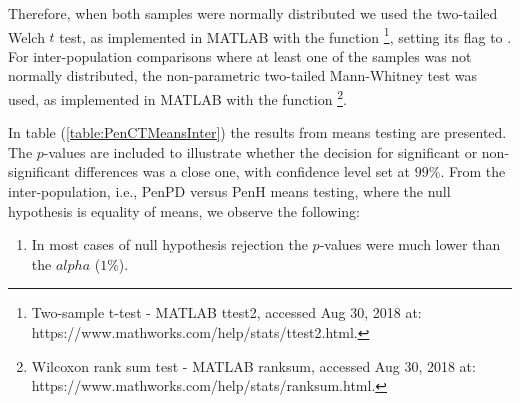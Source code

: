 Therefore, when both samples were normally distributed we used the two-tailed Welch $t$ test, as implemented in MATLAB with the function \footnote{Two-sample t-test - MATLAB ttest2, accessed Aug 30, 2018 at: https://www.mathworks.com/help/stats/ttest2.html.}, setting its  flag to . For inter-population comparisons where at least one of the samples was not normally distributed, the non-parametric two-tailed Mann-Whitney test was used, as implemented in MATLAB with the function \footnote{Wilcoxon rank sum test - MATLAB ranksum, accessed Aug 30, 2018 at: https://www.mathworks.com/help/stats/ranksum.html.}. 

In table (\ref{table:PenCTMeansInter}) the results from means testing are presented. The $p$-values are included to illustrate whether the decision for significant or non-significant differences was a close one, with confidence level set at $99\%$. From the inter-population, i.e., \gls{PenPD} versus \gls{PenH} means testing, where the null hypothesis is equality of means, we observe the following:
\begin{enumerate}
\item In most cases of null hypothesis rejection the $p$-values were much lower than the $alpha$ ($1\%$).
\end{enumerate}

